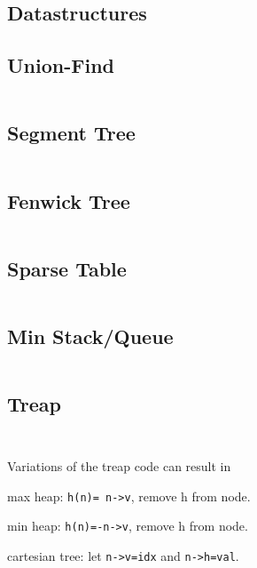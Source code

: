 \documentclass[8pt,a4paper,landscape,oneside]{amsart}
\newenvironment{itemize_compact}
{ \begin{itemize}[leftmargin=.5cm]
    \setlength{\itemsep}{0pt}
    \setlength{\parskip}{0pt}
    \setlength{\parsep}{0pt}     }
{ \end{itemize}                  }
\begin{document}
\begin{multicols*}{2}
		\section{Datastructures}
	\begin{multicols*}{2}		
		\subsection{Union-Find}
		\inputminted[firstline=9,lastline=19]{c++}{_code/datastructures/union_find.cpp}
		\subsection{Segment Tree}
		\inputminted[firstline=14,lastline=52]{c++}{_code/datastructures/segment_tree.cpp}
		\vfill\null
		\columnbreak
		\subsection{Fenwick Tree}
		\inputminted[firstline=14,lastline=32]{c++}{_code/datastructures/fenwick_tree.cpp}
		\subsection{Sparse Table}
		\inputminted[firstline=15,lastline=23]{c++}{_code/datastructures/sparse_table.cpp}
		\subsection{Min Stack/Queue}
		\inputminted[firstline=15,lastline=31]{c++}{_code/datastructures/min_queue.cpp}
		\vfill\null
	\end{multicols*}
	\begin{multicols*}{2}
		\subsection{Treap}
		\inputminted[firstline=16,lastline=67]{c++}{_code/datastructures/treap.cpp}
		\vfill\null
		\columnbreak
		\inputminted[firstline=68,lastline=115]{c++}{_code/datastructures/treap.cpp}
		\noindent
		Variations of the treap code can result in
		\begin{itemize_compact}
			\item max heap: \texttt{h(n)= n->v}, remove h from node.
			\item min heap: \texttt{h(n)=-n->v}, remove h from node.
			\item cartesian tree: let \texttt{n->v=idx} and \texttt{n->h=val}.
		\end{itemize_compact}
		\vfill\null
	\end{multicols*}
	\newpage
	\begin{multicols*}{2}

\end{multicols*}
\end{multicols*}
\end{document}
